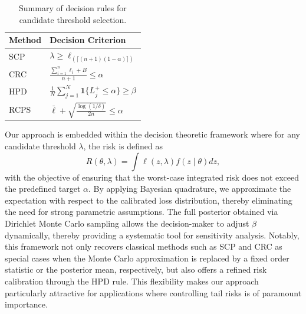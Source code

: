 \documentclass{article}
\begin{document}
\begin{table}[ht]
\centering
\begin{tabular}{|l|l|}
\hline
Method & Decision Criterion \\ \hline
SCP  & \(\lambda \ge \ell_{(\lceil (n+1)(1-\alpha) \rceil)}\) \\ \hline
CRC  & \(\frac{\sum_{i=1}^n \ell_i + B}{n+1} \le \alpha\) \\ \hline
HPD  & \(\frac{1}{N}\sum_{j=1}^N \mathbf{1}\{L^+_j \le \alpha\} \ge \beta\) \\ \hline
RCPS & \(\bar{\ell} + \sqrt{\frac{\log(1/\delta)}{2n}} \le \alpha\) \\ \hline
\end{tabular}
\caption{Summary of decision rules for candidate threshold selection.}
\label{tab:methods}
\end{table}

Our approach is embedded within the decision theoretic framework where for any candidate threshold \(\lambda\), the risk is defined as 
\[
R(\theta, \lambda) = \int \ell(z,\lambda)f(z \mid \theta)dz,
\]
with the objective of ensuring that the worst-case integrated risk does not exceed the predefined target \(\alpha\). By applying Bayesian quadrature, we approximate the expectation with respect to the calibrated loss distribution, thereby eliminating the need for strong parametric assumptions. The full posterior obtained via Dirichlet Monte Carlo sampling allows the decision-maker to adjust \(\beta\) dynamically, thereby providing a systematic tool for sensitivity analysis. Notably, this framework not only recovers classical methods such as SCP and CRC as special cases when the Monte Carlo approximation is replaced by a fixed order statistic or the posterior mean, respectively, but also offers a refined risk calibration through the HPD rule. This flexibility makes our approach particularly attractive for applications where controlling tail risks is of paramount importance.
\end{document}
